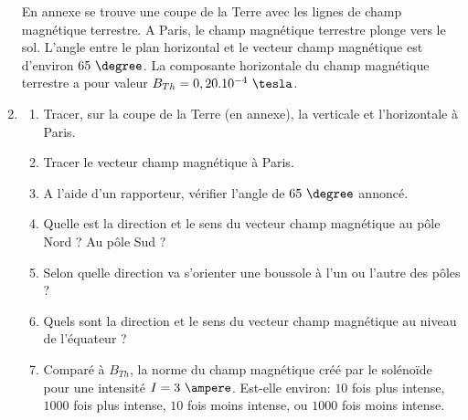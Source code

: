 \begin{enumerate}
En annexe se trouve une coupe de la Terre avec les lignes de champ magnétique terrestre. A Paris, le champ magnétique terrestre plonge vers le sol. L'angle entre le plan horizontal et le vecteur champ magnétique est d'environ $65\text{ }\degree$. La composante horizontale du champ magnétique terrestre a pour valeur $B_{Th} = 0,20 . 10^{-4}\text{ }\tesla$.

\item \begin{enumerate}[label=(\alph*)]
\item Tracer, sur la coupe de la Terre (en annexe), la verticale et l'horizontale à Paris.
\item Tracer le vecteur champ magnétique à Paris.
\item A l'aide d'un rapporteur, vérifier l'angle de $65\text{ }\degree$ annoncé.
\item Quelle est la direction et le sens du vecteur champ magnétique au pôle Nord ? Au pôle Sud ?
\item Selon quelle direction va s'orienter une boussole à l'un ou l'autre des pôles ?
\item Quels sont la direction et le sens du vecteur champ magnétique au niveau de l'équateur ?
\item Comparé à $B_{Th}$, la norme du champ magnétique créé par le solénoïde pour une intensité $I=3\text{ }\ampere$. Est-elle environ: $10$ fois plus intense, $1000$ fois plus intense, $10$ fois moins intense, ou $1000$ fois moins intense.
\end{enumerate}
\end{enumerate}

\vspace{0.3cm}

